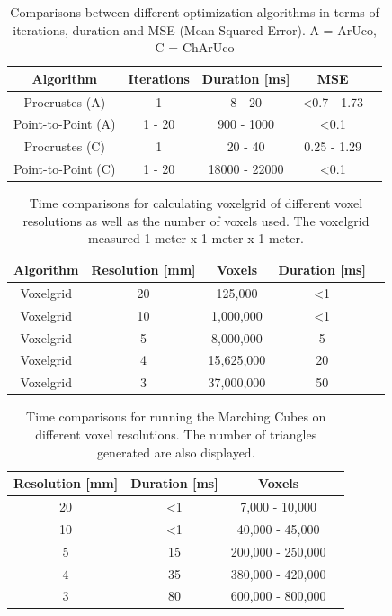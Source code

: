 \documentclass[10pt,twocolumn,letterpaper]{article}
\begin{document}
\begin{table}[h!]
  \begin{center}
    \begin{tabular}{c|c|c|c p{4cm}}
      \textbf{Algorithm} & \textbf{Iterations} & \textbf{Duration [ms]} & \textbf{MSE}\\
      \hline
      Procrustes (A)  & 1 & 8 - 20 & \textless 0.7 - 1.73\\
      Point-to-Point (A) & 1 - 20 & 900 - 1000 & \textless 0.1\\
      Procrustes (C) & 1 & 20 - 40 & 0.25 - 1.29\\
      Point-to-Point (C) & 1 - 20 & 18000 - 22000 & \textless 0.1\\
    \end{tabular}
     \caption{Comparisons between different optimization algorithms in terms of iterations, duration and MSE (Mean Squared Error). A = ArUco, C = ChArUco}
     \label{tab:camera-calibration}
  \end{center}
\end{table}

\begin{table}[h!]
  \begin{center}
    \begin{tabular}{c|c|c|c p{4cm}}
      \textbf{Algorithm} & \textbf{Resolution [mm]} & \textbf{Voxels} & \textbf{Duration [ms]}\\
      \hline
      Voxelgrid & 20 & 125,000 & \textless 1\\
      Voxelgrid & 10 & 1,000,000 & \textless 1\\
      Voxelgrid & 5 & 8,000,000 & 5\\
      Voxelgrid & 4 & 15,625,000 & 20\\
      Voxelgrid & 3 & 37,000,000 & 50\\
    \end{tabular}
     \caption{Time comparisons for calculating voxelgrid of different voxel resolutions as well as the number of voxels used. The voxelgrid measured 1 meter x 1 meter x 1 meter.}
     \label{tab:voxelgrid}
  \end{center}
\end{table}

\begin{table}[h!]
  \begin{center}
    \begin{tabular}{c|c|c p{4cm}}
      \textbf{Resolution [mm]} & \textbf{Duration [ms]} & \textbf{Voxels}\\
      \hline
      20 & \textless 1 & 7,000 - 10,000\\
      10 & \textless 1 & 40,000 - 45,000\\
      5 & 15 & 200,000 - 250,000\\
      4 & 35 & 380,000 - 420,000\\
      3 & 80 & 600,000 - 800,000\\
    \end{tabular}
     \caption{Time comparisons for running the Marching Cubes on different voxel resolutions. The number of triangles generated are also displayed.}
     \label{tab:table3}
  \end{center}
\end{table}
\end{document}
